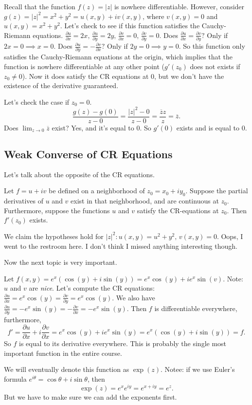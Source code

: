 \begin{example}
    Recall that the function $f(z)=|z|$ is nowhere differentiable. However, consider $g(z)=|z|^2=x^2+y^2=u(x,y)+iv(x,y)$, where $v(x,y)=0$ and $u(x,y)=x^2+y^2$. Let's check to see if this function satisfies the Cauchy-Riemann equations. $\frac{\partial u}{\partial x}=2x,\, \frac{\partial u}{\partial y}=2y, \, \frac{\partial v}{\partial x}=0,\, \frac{\partial v}{\partial y}=0$. Does $\frac{\partial u}{\partial x}=\frac{\partial v}{\partial y}?$ Only if $2x=0 \implies x=0$. Does $\frac{\partial u}{\partial y}=-\frac{\partial v}{\partial x}?$ Only if $2y=0\implies y=0$. So this function only satisfies the Cauchy-Riemann equations at the origin, which implies that the function is nowhere differentiable at any other point ($g'(z_0)$ does not exists if $z_0\neq 0$). Now it does satisfy the CR equations at $0$, but we don't have the existence of the derivative guaranteed.

    Let's check the case if $z_0=0$. \[
        \frac{g(z)-g(0)}{z-0}=\frac{|z|^2-0}{z-0}=\frac{\overline{z}z}{z}=\overline{z}.
    \] Does $\lim_{z\to 0}\overline{z}$ exist? Yes, and it's equal to $0$. So $g'(0)$ exists and is equal to $0$.
\end{example}

\subsection{Weak Converse of CR Equations}
Let's talk about the opposite of the CR equations.
\begin{theorem}
    Let $f=u+iv$ be defined on a neighborhood of $z_0=x_0+iy_0$. Suppose the partial derivatives of $u$ and $v$ exist in that neighborhood, and are continuous at $z_0$. Furthermore, suppose the functions $u$ and $v$ satisfy the CR-equations at $z_0$. Then $f'(z_0)$ exists.
\end{theorem}
\begin{note}
    We claim the hypotheses hold for $|z|^2: u(x,y)=u^2+y^2,\, v(x,y)=0$. Oops, I went to the restroom here. I don't think I missed anything interesting though.
\end{note}
Now the next topic is very important. 
\begin{example}
    Let $f(x,y)=e^{x}(\cos(y)+i\sin(y))=e^{x}\cos(y)+ie^{x}\sin(v)$. Note: $u$ and $v$ are \emph{nice}. Let's compute the CR equations: $\frac{\partial u}{\partial x}=e^{x}\cos(y)=\frac{\partial v}{\partial y}=e^{x}\cos(y)$. We also have $\frac{\partial u}{\partial y}=-e^{x}\sin(y)=-\frac{\partial v}{\partial x}=-e^{x}\sin(y)$. Then $f$ is differentiable everywhere, furthermore, 
    \[
    f'=\frac{\partial u}{\partial x}+i \frac{\partial v}{\partial x}=e^{x}\cos(y)+ie^{x}\sin(y)=e^{x}(\cos(y)+i\sin(y))=f.
\] So $f$ is equal to its derivative everywhere. This is probably the single most important function in the entire course. 
\end{example}
We will eventually denote this function as $\exp(z)$. Notee: if we use Euler's formula $e^{i\theta}=\cos\theta+i\sin \theta$, then \[
    \exp(z)=e^{x}e^{iy}=e^{x+iy}=e^{z}.
\] But we have to make sure we can add the exponents first. 

